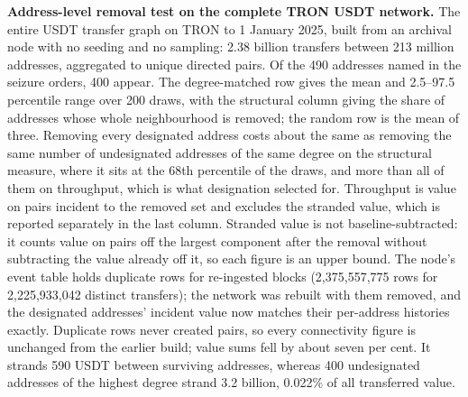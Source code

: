 \caption{\textbf{Address-level removal test on the complete TRON USDT network.} The entire USDT transfer graph on TRON to 1 January 2025, built from an archival node with no seeding and no sampling: 2.38 billion transfers between 213 million addresses, aggregated to unique directed pairs. Of the 490 addresses named in the seizure orders, 400 appear. The degree-matched row gives the mean and 2.5--97.5 percentile range over 200 draws, with the structural column giving the share of addresses whose whole neighbourhood is removed; the random row is the mean of three. Removing every designated address costs about the same as removing the same number of undesignated addresses of the same degree on the structural measure, where it sits at the 68th percentile of the draws, and more than all of them on throughput, which is what designation selected for. Throughput is value on pairs incident to the removed set and excludes the stranded value, which is reported separately in the last column. Stranded value is not baseline-subtracted: it counts value on pairs off the largest component after the removal without subtracting the value already off it, so each figure is an upper bound. The node's event table holds duplicate rows for re-ingested blocks (2,375,557,775 rows for 2,225,933,042 distinct transfers); the network was rebuilt with them removed, and the designated addresses' incident value now matches their per-address histories exactly. Duplicate rows never created pairs, so every connectivity figure is unchanged from the earlier build; value sums fell by about seven per cent. It strands 590 USDT between surviving addresses, whereas 400 undesignated addresses of the highest degree strand 3.2 billion, 0.022\% of all transferred value.}
\label{tab:full-network}
\small
